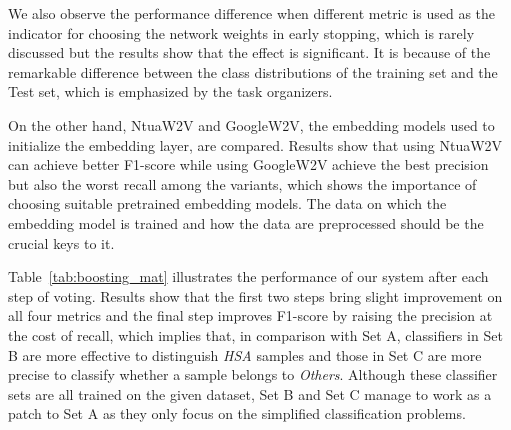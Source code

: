 \documentclass[11pt,a4paper]{article}
\begin{document}
We also observe the performance difference when different metric is used as the indicator for choosing the network weights in early stopping, which is rarely discussed but the results show that the effect is significant. It is because of the remarkable difference between the class distributions of the training set and the Test set, which is emphasized by the task organizers.

On the other hand, NtuaW2V and GoogleW2V, the embedding models used to initialize the embedding layer, are compared. Results show that using NtuaW2V can achieve better F1-score while using GoogleW2V achieve the best precision but also the worst recall among the variants, which shows the importance of choosing suitable pretrained embedding models. The data on which the embedding model is trained and how the data are preprocessed should be the crucial keys to it.


Table~\ref{tab:boosting_mat} illustrates the performance of our system after each step of voting. Results show that the first two steps bring slight improvement on all four metrics and the final step improves F1-score by raising the precision at the cost of recall, which implies that, in comparison with Set A, classifiers in Set B are more effective to distinguish {\em HSA} samples and those in Set C are more precise to classify whether a sample belongs to {\em Others}. Although these classifier sets are all trained on the given dataset, Set B and Set C manage to work as a patch to Set A as they only focus on the simplified classification problems.

\end{document}
